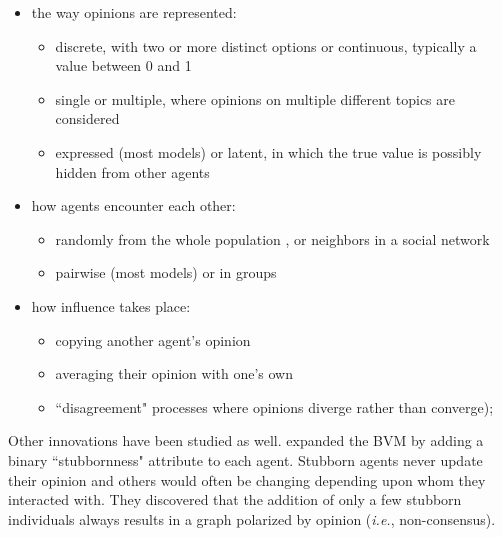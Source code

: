 \begin{itemize}
\item the way opinions are represented:
    \begin{itemize}
    \item discrete, with two or more distinct options \cite{follmer_random_1974,yildiz_discrete_2011} or
    continuous, typically a value between 0 and 1 \cite{ghaderi_opinion_2012,weisbuch_interacting_2001}

    \item single \cite{weisbuch_dynamical_1999} or
    multiple, where opinions on multiple different topics are considered \cite{deffuant_mixing_2000,sirbu_opinion_2013}

    \item expressed (most models) or latent, in which the true value is possibly hidden from other agents \cite{friedkin_social_1990}
    \end{itemize}

\item how agents encounter each other:
    \begin{itemize}
    \item randomly from the whole population \cite{hegselmann_opinion_2002}, or %
    neighbors in a social network \cite{clifford_model_1973,holley_ergodic_1975}
    \item pairwise (most models) or in groups \cite{degroot_reaching_1974}
    
    \end{itemize}
\item how influence takes place:
    \begin{itemize}
    \item copying another agent's opinion \cite{holley_ergodic_1975}
    \item averaging their opinion with one's own \cite{degroot_reaching_1974}
    \item ``disagreement" processes where opinions diverge rather than
converge\cite{sirbu_opinion_2013});
    \end{itemize}

\end{itemize}

Other innovations have been studied as well. 
\cite{yildiz_discrete_2011} expanded the BVM by adding a binary
``stubbornness" attribute to each agent. Stubborn agents never update their
opinion and 
others would often be changing depending upon whom they interacted with. They
discovered that the addition of only a few stubborn individuals always
results in a graph polarized by opinion (\textit{i.e.}, non-consensus).

